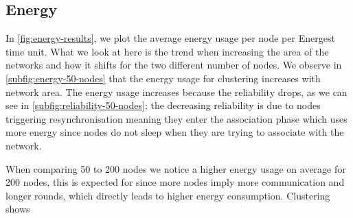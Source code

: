 \subsection{Energy}
In \cref{fig:energy-results}, we plot the average energy usage per node per Energest time unit. What we look at here is the trend when increasing the area of the networks and how it shifts for the two different number of nodes. We observe in \cref{subfig:energy-50-nodes} that the energy usage for clustering increases with network area. The energy usage increases because the reliability drops, as we can see in \cref{subfig:reliability-50-nodes}; the decreasing reliability is due to nodes triggering resynchronisation meaning they enter the association phase which uses more energy since nodes do not sleep when they are trying to associate with the network.

When comparing 50 to 200 nodes we notice a higher energy usage on average for 200 nodes, this is expected for \atwo{} since more nodes imply more communication and longer rounds, which directly leads to higher energy consumption. Clustering shows

